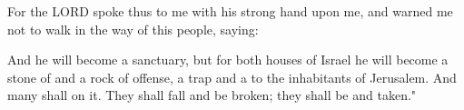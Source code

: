 \documentclass[11pt]{article}
\begin{document}
\begin{biblicaloutline}[Isaiah 8:11-15]

    \begin{versesection}{2em}
         For the LORD spoke thus to me with his strong hand upon me, and warned me not to walk in the way of this people, saying:
    \end{versesection}

    \begin{chiasticoutline}[]{.95em}{2em}
        
        
        

    \end{chiasticoutline}

    \begin{versesection}{2em}
         And he will become a sanctuary, but for both houses of Israel he will become a stone of  and a rock of offense, a trap and a  to the inhabitants of Jerusalem.  And many shall  on it. They shall fall and be broken; they shall be  and taken."
    \end{versesection}

\end{biblicaloutline}
\end{document}
